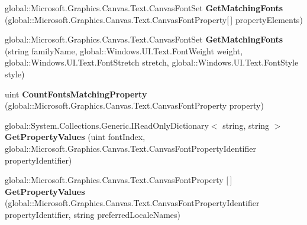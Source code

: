 \begin{DoxyCompactItemize}
global\+::\+Microsoft.\+Graphics.\+Canvas.\+Text.\+Canvas\+Font\+Set {\bfseries Get\+Matching\+Fonts} (global\+::\+Microsoft.\+Graphics.\+Canvas.\+Text.\+Canvas\+Font\+Property\mbox{[}$\,$\mbox{]} property\+Elements)
\item 
\mbox{\label{interface_microsoft_1_1_graphics_1_1_canvas_1_1_text_1_1_i_canvas_font_set_ade4753638611bbb574a4ebc50e68e70e}} 
global\+::\+Microsoft.\+Graphics.\+Canvas.\+Text.\+Canvas\+Font\+Set {\bfseries Get\+Matching\+Fonts} (string family\+Name, global\+::\+Windows.\+U\+I.\+Text.\+Font\+Weight weight, global\+::\+Windows.\+U\+I.\+Text.\+Font\+Stretch stretch, global\+::\+Windows.\+U\+I.\+Text.\+Font\+Style style)
\item 
\mbox{\label{interface_microsoft_1_1_graphics_1_1_canvas_1_1_text_1_1_i_canvas_font_set_a1def5cacbe2bad80bc122419229c2640}} 
uint {\bfseries Count\+Fonts\+Matching\+Property} (global\+::\+Microsoft.\+Graphics.\+Canvas.\+Text.\+Canvas\+Font\+Property property)
\item 
\mbox{\label{interface_microsoft_1_1_graphics_1_1_canvas_1_1_text_1_1_i_canvas_font_set_a2a80bf73d063c25da9b75f227e594ff8}} 
global\+::\+System.\+Collections.\+Generic.\+I\+Read\+Only\+Dictionary$<$ string, string $>$ {\bfseries Get\+Property\+Values} (uint font\+Index, global\+::\+Microsoft.\+Graphics.\+Canvas.\+Text.\+Canvas\+Font\+Property\+Identifier property\+Identifier)
\item 
\mbox{\label{interface_microsoft_1_1_graphics_1_1_canvas_1_1_text_1_1_i_canvas_font_set_a8b18fb74693b3e6e70b6e7d5f9d95d79}} 
global\+::\+Microsoft.\+Graphics.\+Canvas.\+Text.\+Canvas\+Font\+Property \mbox{[}$\,$\mbox{]} {\bfseries Get\+Property\+Values} (global\+::\+Microsoft.\+Graphics.\+Canvas.\+Text.\+Canvas\+Font\+Property\+Identifier property\+Identifier, string preferred\+Locale\+Names)
\item 
\mbox{\label{interface_microsoft_1_1_graphics_1_1_canvas_1_1_text_1_1_i_canvas_font_set_a02fa760e9e493370176b87152cad6b1e}} 

\end{DoxyCompactItemize}
